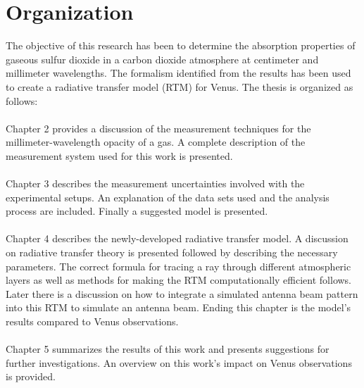 \section{Organization}
The objective of this research has been to determine the absorption properties of gaseous sulfur dioxide in a carbon dioxide atmosphere at centimeter and millimeter wavelengths. The formalism identified from the results has been used to create a radiative transfer model (RTM) for Venus. The thesis is organized as follows:
\\ \\
\noindent Chapter 2 provides a discussion of the measurement techniques for the millimeter-wavelength opacity of a gas. A complete description of the measurement system used for this work is presented.
\\ \\
\noindent Chapter 3 describes the measurement uncertainties involved with the experimental setups. An explanation of the data sets used and the analysis process are included. Finally a suggested model is presented.
\\ \\
\noindent Chapter 4 describes the newly-developed radiative transfer model. A discussion on radiative transfer theory is presented followed by describing the necessary parameters. The correct formula for tracing a ray through different atmospheric layers as well as methods for making the RTM computationally efficient follows. Later there is a discussion on how to integrate a simulated antenna beam pattern into this RTM to simulate an antenna beam. Ending this chapter is the model's results compared to Venus observations.
\\ \\
\noindent Chapter 5 summarizes the results of this work and presents suggestions for further investigations. An overview on this work's impact on Venus observations is provided.
